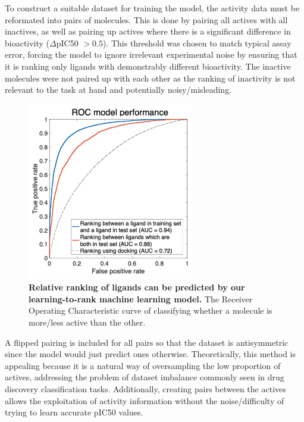 To construct a suitable dataset for training the model, the activity data must be reformated into pairs of molecules. This is done by pairing all actives with all inactives, as well as pairing up actives where there is a significant difference in bioactivity ($\Delta$pIC50 $>0.5$). This threshold was chosen to match typical assay error, forcing the model to ignore irrelevant experimental noise by ensuring that it is ranking only ligands with demonstrably different bioactivity. The inactive molecules were not paired up with each other as the ranking of inactivity is not relevant to the task at hand and potentially noisy/misleading.

\begin{figure}[!th]
 \centering
 \includegraphics[width=0.65\textwidth]{Chapters/Ranking/Figs/roc_curve.png}
 \caption{\textbf{Relative ranking of ligands can be predicted by our learning-to-rank machine learning model.} The Receiver Operating Characteristic curve of classifying whether a molecule is more/less active than the other.}
 \label{fig:roc_plot}
\end{figure}

A flipped pairing is included for all pairs so that the dataset is antisymmetric since the model would just predict ones otherwise. Theoretically, this method is appealing because it is a natural way of oversampling the low proportion of actives, addressing the problem of dataset imbalance commonly seen in drug discovery classification tasks. Additionally, creating pairs between the actives allows the exploitation of activity information without the noise/difficulty of trying to learn accurate pIC50 values.


